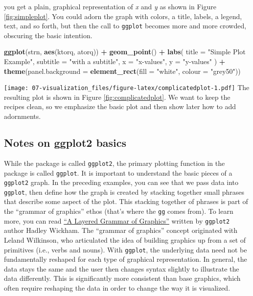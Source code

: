 \documentclass[
]{book}
\newenvironment{Shaded}{\begin{snugshade}}{\end{snugshade}}
\newcommand{\DataTypeTok}[1]{\textcolor[rgb]{0.13,0.29,0.53}{#1}}
\newcommand{\KeywordTok}[1]{\textcolor[rgb]{0.13,0.29,0.53}{\textbf{#1}}}
\newcommand{\NormalTok}[1]{#1}
\newcommand{\OperatorTok}[1]{\textcolor[rgb]{0.81,0.36,0.00}{\textbf{#1}}}
\newcommand{\StringTok}[1]{\textcolor[rgb]{0.31,0.60,0.02}{#1}}
\begin{document}
you get a plain, graphical representation of \emph{x} and \emph{y} as shown in Figure \ref{fig:simpleplot}.
You could adorn the graph with colors, a title, labels, a legend, text, and so forth, but
then the call to \texttt{ggplot} becomes more and more crowded, obscuring the
basic intention.

\begin{Shaded}
\begin{Highlighting}[]
\KeywordTok{ggplot}\NormalTok{(strn, }\KeywordTok{aes}\NormalTok{(ktorq, atorq)) }\OperatorTok{+}
\StringTok{  }\KeywordTok{geom_point}\NormalTok{() }\OperatorTok{+}
\StringTok{  }\KeywordTok{labs}\NormalTok{(}
    \DataTypeTok{title =} \StringTok{"Simple Plot Example"}\NormalTok{,}
    \DataTypeTok{subtitle =} \StringTok{"with a subtitle"}\NormalTok{,}
    \DataTypeTok{x =} \StringTok{"x-values"}\NormalTok{,}
    \DataTypeTok{y =} \StringTok{"y-values"}
\NormalTok{  ) }\OperatorTok{+}
\StringTok{  }\KeywordTok{theme}\NormalTok{(}\DataTypeTok{panel.background =} \KeywordTok{element_rect}\NormalTok{(}\DataTypeTok{fill =} \StringTok{"white"}\NormalTok{, }\DataTypeTok{colour =} \StringTok{"grey50"}\NormalTok{))}
\end{Highlighting}
\end{Shaded}

\texttt{[image: 07-visualization\_files/figure-latex/complicatedplot-1.pdf]}
The resulting plot is shown in Figure \ref{fig:complicatedplot}. We want to keep the recipes clean, so we emphasize the basic plot and then show later how to add adornments.

\hypertarget{notes-on-ggplot2-basics}{%
\subsection*{Notes on ggplot2 basics}\label{notes-on-ggplot2-basics}}

While the package is called \texttt{ggplot2}, the primary plotting function in the package is called \texttt{ggplot}. It is important to understand the basic pieces of a \texttt{ggplot2} graph. In the preceding examples, you can see that we pass data into \texttt{ggplot}, then define how the graph is created by stacking together small phrases that describe some aspect of the plot. This stacking together of phrases is part of the ``grammar of graphics'' ethos (that's where the \texttt{gg} comes from).
To learn more, you can read \href{http://vita.had.co.nz/papers/layered-grammar.pdf}{``A Layered Grammar of Graphics''} written by \texttt{ggplot2} author Hadley Wickham.
The ``grammar of graphics'' concept originated with Leland Wilkinson, who articulated the idea of building graphics up from a set of primitives (i.e., verbs and nouns). With \texttt{ggplot}, the underlying data need not be fundamentally reshaped for each type of graphical representation. In general, the data stays the same and the user then changes syntax slightly to illustrate the data differently. This is significantly more consistent than base graphics, which often require reshaping the data in order to change the way it is visualized.
\end{document}
